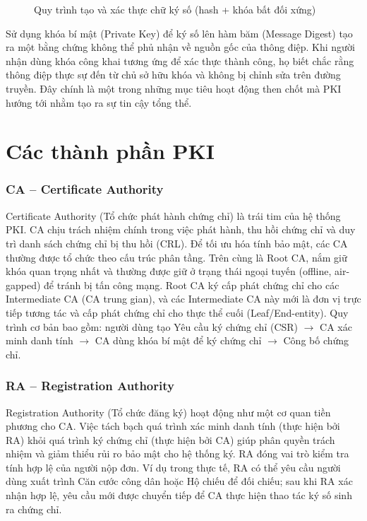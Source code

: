 \begin{figure}[htbp]
    \centering
    \caption{Quy trình tạo và xác thực chữ ký số (hash + khóa bất đối xứng)}
    \label{fig:digital-signature-process}
\end{figure}

Sử dụng khóa bí mật (Private Key) để ký số lên hàm băm (Message Digest) tạo ra một bằng chứng không thể phủ nhận về nguồn gốc của thông điệp. Khi người nhận dùng khóa công khai tương ứng để xác thực thành công, họ biết chắc rằng thông điệp thực sự đến từ chủ sở hữu khóa và không bị chỉnh sửa trên đường truyền. Đây chính là một trong những mục tiêu hoạt động then chốt mà PKI hướng tới nhằm tạo ra sự tin cậy tổng thể.


\section{Các thành phần PKI}
\label{sec:3.3}

\subsubsection*{CA -- Certificate Authority}
Certificate Authority (Tổ chức phát hành chứng chỉ) là trái tim của hệ thống PKI. CA chịu trách nhiệm chính trong việc phát hành, thu hồi chứng chỉ và duy trì danh sách chứng chỉ bị thu hồi (CRL). Để tối ưu hóa tính bảo mật, các CA thường được tổ chức theo cấu trúc phân tầng. Trên cùng là Root CA, nắm giữ khóa quan trọng nhất và thường được giữ ở trạng thái ngoại tuyến (offline, air-gapped) để tránh bị tấn công mạng. Root CA ký cấp phát chứng chỉ cho các Intermediate CA (CA trung gian), và các Intermediate CA này mới là đơn vị trực tiếp tương tác và cấp phát chứng chỉ cho thực thể cuối (Leaf/End-entity). Quy trình cơ bản bao gồm: người dùng tạo Yêu cầu ký chứng chỉ (CSR) $\rightarrow$ CA xác minh danh tính $\rightarrow$ CA dùng khóa bí mật để ký chứng chỉ $\rightarrow$ Công bố chứng chỉ.

\subsubsection*{RA -- Registration Authority}
Registration Authority (Tổ chức đăng ký) hoạt động như một cơ quan tiền phương cho CA. Việc tách bạch quá trình xác minh danh tính (thực hiện bởi RA) khỏi quá trình ký chứng chỉ (thực hiện bởi CA) giúp phân quyền trách nhiệm và giảm thiểu rủi ro bảo mật cho hệ thống ký. RA đóng vai trò kiểm tra tính hợp lệ của người nộp đơn. Ví dụ trong thực tế, RA có thể yêu cầu người dùng xuất trình Căn cước công dân hoặc Hộ chiếu để đối chiếu; sau khi RA xác nhận hợp lệ, yêu cầu mới được chuyển tiếp để CA thực hiện thao tác ký số sinh ra chứng chỉ.

